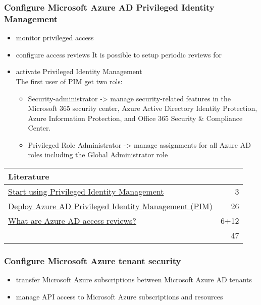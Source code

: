 \subsubsection{Configure Microsoft Azure AD Privileged Identity Management}
\begin{itemize}
\item monitor privileged access 

\item configure access reviews 
It is possible to setup periodic reviews for 
\item activate Privileged Identity Management \\
The first user of PIM get two rols:
\begin{itemize}
	\item Security-administrator ->  manage security-related features in the Microsoft 365 security center, Azure Active Directory Identity Protection, Azure Information Protection, and Office 365 Security \& Compliance Center.
	\item Privileged Role Administrator -> manage assignments for all Azure AD roles including the Global Administrator role
\end{itemize}
\end{itemize}

\begin{tabular}{p{14cm} | r}
\textbf{Literature} & \\
\hline
\href{https://docs.microsoft.com/en-us/azure/active-directory/privileged-identity-management/pim-getting-started}{Start using Privileged Identity Management} & 3 \\
\href{https://docs.microsoft.com/en-us/azure/active-directory/privileged-identity-management/pim-deployment-plan}{Deploy Azure AD Privileged Identity Management (PIM)} & 26 \\
\href{https://docs.microsoft.com/en-us/azure/active-directory/governance/access-reviews-overview}{What are Azure AD access reviews?} & 6+12 \\
\cline{2-2} 
 & 47 \\
\end{tabular}

\subsubsection{Configure Microsoft Azure tenant security}
\begin{itemize}
\item transfer Microsoft Azure subscriptions between Microsoft Azure AD tenants 
\item manage API access to Microsoft Azure subscriptions and resources 
\end{itemize}

